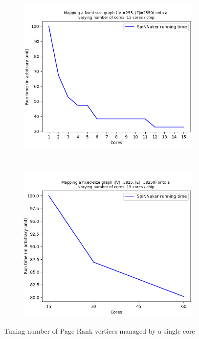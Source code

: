 \begin{figure}[!ht]
    \centering
    \begin{subfigure}[b]{0.5\textwidth}
        \includegraphics[width=\textwidth]{figures/atoms_per_core_vs_running_time-1.png}
        \caption{} \label{fig:graph21}
    \end{subfigure}%
    ~
    \begin{subfigure}[b]{0.5\textwidth}
        \includegraphics[width=\textwidth]{figures/atoms_per_core_vs_running_time-2.png}
        \caption{} \label{fig:graph22}
    \end{subfigure}
    \caption{Tuning number of Page Rank vertices managed by a single core}
    \label{fig:graph2}
\end{figure} 

